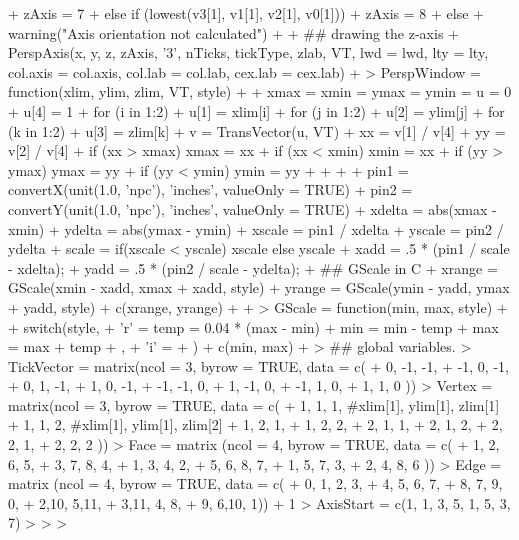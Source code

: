 \documentclass[paper=a4, fontsize=11pt]{report}
\begin{document}
\begin{Schunk}
\begin{Sinput}
{{+             zAxis = 7
+         }else if (lowest(v3[1], v1[1], v2[1], v0[1])) {
+             zAxis = 8
+         }else
+     warning("Axis orientation not calculated")
+ 
+     ## drawing the z-axis
+     PerspAxis(x, y, z, zAxis, '3', nTicks, tickType, zlab, VT, lwd = lwd, lty = lty, col.axis = col.axis, col.lab = col.lab, cex.lab = cex.lab)
+ }
> PerspWindow = function(xlim, ylim, zlim, VT, style)
+ {
+     xmax = xmin = ymax = ymin = u = 0
+     u[4] = 1
+     for (i in 1:2) {
+         u[1] = xlim[i]
+         for (j in 1:2) {
+             u[2] = ylim[j]
+             for (k in 1:2) {
+                 u[3] = zlim[k]
+                 v = TransVector(u, VT)
+                 xx = v[1] / v[4]
+                 yy = v[2] / v[4]
+                 if (xx > xmax) xmax = xx
+                 if (xx < xmin) xmin = xx
+                 if (yy > ymax) ymax = yy
+                 if (yy < ymin) ymin = yy
+           }
+         }
+     }
+     pin1 = convertX(unit(1.0, 'npc'), 'inches', valueOnly = TRUE)
+     pin2 = convertY(unit(1.0, 'npc'), 'inches', valueOnly = TRUE)
+     xdelta = abs(xmax - xmin)
+     ydelta = abs(ymax - ymin)
+     xscale = pin1 / xdelta
+     yscale = pin2 / ydelta
+     scale = if(xscale < yscale) xscale else yscale
+     xadd = .5 * (pin1 / scale - xdelta);
+     yadd = .5 * (pin2 / scale - ydelta);
+     ## GScale in C
+     xrange = GScale(xmin - xadd, xmax + xadd, style)
+     yrange = GScale(ymin - yadd, ymax + yadd, style)
+     c(xrange, yrange)
+   
+ }
> GScale = function(min, max, style)
+ {
+   switch(style, 
+          'r' = {temp = 0.04 * (max - min)
+          min = min - temp
+          max = max + temp
+          },
+          'i' = {}
+   )
+   c(min, max)
+ }
> ## global variables.
> TickVector = matrix(ncol = 3, byrow = TRUE, data = c(
+     0, -1, -1,
+     -1, 0, -1,
+     0, 1, -1,
+     1, 0, -1,
+     -1, -1, 0,
+     1, -1, 0,
+     -1, 1, 0,
+     1, 1, 0 ))
> Vertex = matrix(ncol = 3, byrow = TRUE, data = c(
+ 	1, 1, 1,  #xlim[1], ylim[1], zlim[1]
+ 	1, 1, 2,  #xlim[1], ylim[1], zlim[2]
+ 	1, 2, 1,
+ 	1, 2, 2,
+ 	2, 1, 1,
+ 	2, 1, 2,
+ 	2, 2, 1,
+ 	2, 2, 2 ))
> Face  = matrix (ncol = 4, byrow = TRUE, data = c(
+     1, 2, 6, 5,
+     3, 7, 8, 4,
+     1, 3, 4, 2,
+     5, 6, 8, 7,
+     1, 5, 7, 3,
+     2, 4, 8, 6 ))
> Edge  = matrix (ncol = 4, byrow = TRUE, data = c(
+     0, 1, 2, 3,
+     4, 5, 6, 7,
+     8, 7, 9, 0,
+     2,10, 5,11,
+     3,11, 4, 8,
+     9, 6,10, 1)) + 1
> AxisStart = c(1, 1, 3, 5, 1, 5, 3, 7)
> 
> 
> 
\end{Sinput}
\end{Schunk}
\newpage
\end{document}
